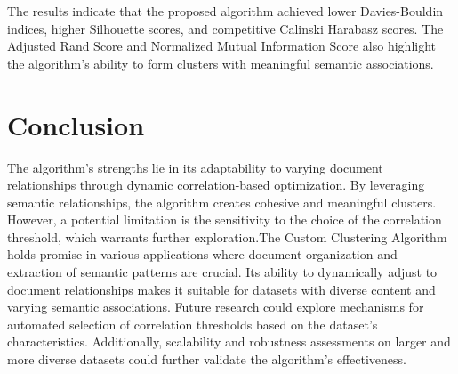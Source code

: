 \documentclass{article}
\begin{document}
The results indicate that the proposed algorithm achieved lower Davies-Bouldin indices, higher Silhouette scores, and competitive Calinski Harabasz scores. The Adjusted Rand Score and Normalized Mutual Information Score also highlight the algorithm's ability to form clusters with meaningful semantic associations.

\section{Conclusion}
The algorithm's strengths lie in its adaptability to varying document relationships through dynamic correlation-based optimization. By leveraging semantic relationships, the algorithm creates cohesive and meaningful clusters. However, a potential limitation is the sensitivity to the choice of the correlation threshold, which warrants further exploration.The Custom Clustering Algorithm holds promise in various applications where document organization and extraction of semantic patterns are crucial. Its ability to dynamically adjust to document relationships makes it suitable for datasets with diverse content and varying semantic associations.
Future research could explore mechanisms for automated selection of correlation thresholds based on the dataset's characteristics. Additionally, scalability and robustness assessments on larger and more diverse datasets could further validate the algorithm's effectiveness.



\end{document}
